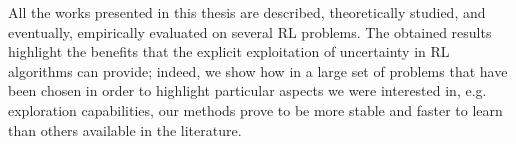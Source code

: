 All the works presented in this thesis are described, theoretically studied, and eventually, empirically evaluated on several RL problems. The obtained results highlight the benefits that the explicit exploitation of uncertainty in RL algorithms can provide; indeed, we show how in a large set of problems that have been chosen in order to highlight particular aspects we were interested in, e.g. exploration capabilities, our methods prove to be more stable and faster to learn than others available in the literature.
